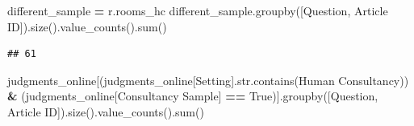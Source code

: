 \documentclass[
]{article}
\newenvironment{Shaded}{\begin{snugshade}}{\end{snugshade}}
\newcommand{\AttributeTok}[1]{\textcolor[rgb]{0.13,0.29,0.53}{#1}}
\newcommand{\BuiltInTok}[1]{#1}
\newcommand{\FunctionTok}[1]{\textcolor[rgb]{0.13,0.29,0.53}{\textbf{#1}}}
\newcommand{\NormalTok}[1]{#1}
\newcommand{\OperatorTok}[1]{\textcolor[rgb]{0.81,0.36,0.00}{\textbf{#1}}}
\newcommand{\OtherTok}[1]{\textcolor[rgb]{0.56,0.35,0.01}{#1}}
\newcommand{\SpecialCharTok}[1]{\textcolor[rgb]{0.81,0.36,0.00}{\textbf{#1}}}
\newcommand{\StringTok}[1]{\textcolor[rgb]{0.31,0.60,0.02}{#1}}
\newcommand{\VariableTok}[1]{\textcolor[rgb]{0.00,0.00,0.00}{#1}}
\begin{document}
\begin{Shaded}
\end{Shaded}

\begin{Shaded}
\begin{Highlighting}[]
\NormalTok{different\_sample }\OperatorTok{=}\NormalTok{ r.rooms\_hc }
\NormalTok{different\_sample.groupby([}\StringTok{\textquotesingle{}Question\textquotesingle{}}\NormalTok{, }\StringTok{\textquotesingle{}Article ID\textquotesingle{}}\NormalTok{]).size().value\_counts().}\BuiltInTok{sum}\NormalTok{()}
\end{Highlighting}
\end{Shaded}

\begin{verbatim}
## 61
\end{verbatim}

\begin{Shaded}
\begin{Highlighting}[]
\NormalTok{judgments\_online[(judgments\_online[}\StringTok{\textquotesingle{}Setting\textquotesingle{}}\NormalTok{].}\BuiltInTok{str}\NormalTok{.contains(}\StringTok{\textquotesingle{}Human Consultancy\textquotesingle{}}\NormalTok{)) }\OperatorTok{\&}\NormalTok{ (judgments\_online[}\StringTok{\textquotesingle{}Consultancy Sample\textquotesingle{}}\NormalTok{] }\OperatorTok{==} \VariableTok{True}\NormalTok{)].groupby([}\StringTok{\textquotesingle{}Question\textquotesingle{}}\NormalTok{, }\StringTok{\textquotesingle{}Article ID\textquotesingle{}}\NormalTok{]).size().value\_counts().}\BuiltInTok{sum}\NormalTok{()}
\end{Highlighting}
\end{Shaded}
\end{document}
